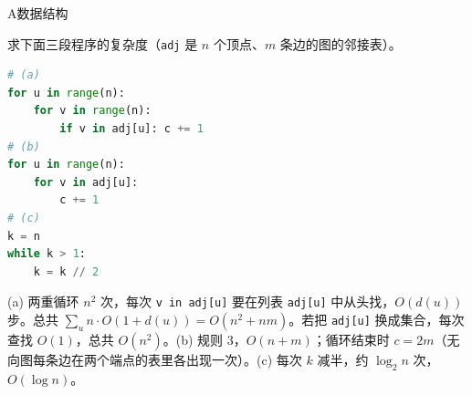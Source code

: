 \begin{exercises}{A}{数据结构}
\item\label{ex:data-structures:A4} 求下面三段程序的复杂度（\texttt{adj} 是 $n$ 个顶点、$m$ 条边的图的邻接表）。
\begin{lstlisting}[language=Python,style=frag]
# (a)
for u in range(n):
    for v in range(n):
        if v in adj[u]: c += 1
# (b)
for u in range(n):
    for v in adj[u]:
        c += 1
# (c)
k = n
while k > 1:
    k = k // 2
\end{lstlisting}
\begin{solution}
(a) 两重循环 $n^2$ 次，每次 \texttt{v in adj[u]} 要在列表 \texttt{adj[u]} 中从头找，$O(d(u))$ 步。总共 $\sum_u n\cdot O(1+d(u))=O(n^2+nm)$。若把 \texttt{adj[u]} 换成集合，每次查找 $O(1)$，总共 $O(n^2)$。(b) 规则 3，$O(n+m)$；循环结束时 $c=2m$（无向图每条边在两个端点的表里各出现一次）。(c) 每次 $k$ 减半，约 $\log_2n$ 次，$O(\log n)$。
\end{solution}
\end{exercises}
